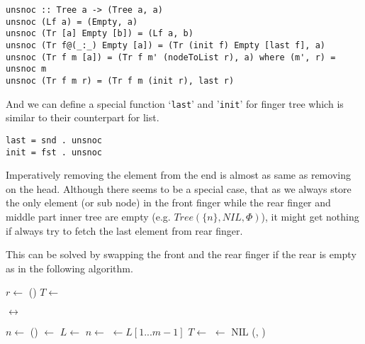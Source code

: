 \documentclass[UTF8]{article}
\begin{document}
\lstset{language=Haskell}
\begin{lstlisting}
unsnoc :: Tree a -> (Tree a, a)
unsnoc (Lf a) = (Empty, a)
unsnoc (Tr [a] Empty [b]) = (Lf a, b)
unsnoc (Tr f@(_:_) Empty [a]) = (Tr (init f) Empty [last f], a)
unsnoc (Tr f m [a]) = (Tr f m' (nodeToList r), a) where (m', r) = unsnoc m
unsnoc (Tr f m r) = (Tr f m (init r), last r)
\end{lstlisting}

And we can define a special function `\verb|last|' and '\verb|init|' for finger tree which is similar
to their counterpart for list.

\begin{lstlisting}
last = snd . unsnoc
init = fst . unsnoc
\end{lstlisting}

Imperatively removing the element from the end is almost as same as removing on the head.
Although there seems to be a special case, that as we always store the only element (or sub node) in the front
finger while the rear finger and middle part inner tree are empty (e.g. $Tree(\{n\}, NIL, \Phi)$),
it might get nothing if always try to fetch the last element from rear finger.

This can be solved by swapping the front and the rear finger if the rear is empty as in the
following algorithm.

\begin{algorithmic}
  \State $r \gets$ ()
  \State {}
    \State $T \gets$ 
  \EndWhile

    \State {}  $\leftrightarrow$ 
  \EndIf

  \State $n \gets $ ()
  \State {} $\gets$ 
  \Repeat
    \State $L \gets$  
    \State $n \gets$  
    \State {} $\gets L[1...m-1]$ 
    \State $T \gets $ 
      \State {} $\gets$ NIL
    \EndIf
  \State \Return (, )
\EndFunction
\end{algorithmic}
\end{document}
